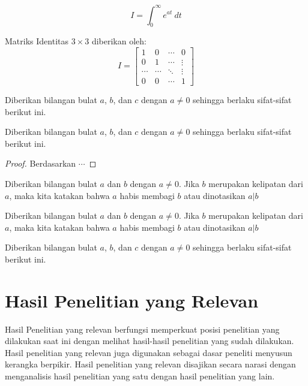 \begin{equation}
	I = \int_0^{\infty} e^{at}~{dt}
\end{equation}

Matriks Identitas $3 \times 3$ diberikan oleh:
\begin{equation}
	I = \begin{bmatrix}
		1 & 0 & \cdots & 0\\
		0 & 1 & \cdots & \vdots\\
		\cdots & \cdots & \ddots &\vdots\\
		0 & 0 & \cdots & 1
	\end{bmatrix}
\end{equation}

\begin{theorem}
	Diberikan bilangan bulat  $a$, $b$, dan $c$ dengan $a \neq 0$ sehingga berlaku sifat-sifat berikut ini.
\end{theorem}

\begin{theorem}
	Diberikan bilangan bulat  $a$, $b$, dan $c$ dengan $a \neq 0$ sehingga berlaku sifat-sifat berikut ini.
\end{theorem}

\begin{proof}
	Berdasarkan $\cdots$
\end{proof}

\begin{definition}
	Diberikan bilangan bulat $a$ dan $b$ dengan $a \neq 0$. Jika $b$ merupakan kelipatan dari $a$, maka kita katakan bahwa  $a$ habis membagi $b$ atau dinotasikan $a|b$
\end{definition}

\begin{example}
	Diberikan bilangan bulat $a$ dan $b$ dengan $a \neq 0$. Jika $b$ merupakan kelipatan dari $a$, maka kita katakan bahwa  $a$ habis membagi $b$ atau dinotasikan $a|b$
\end{example}

\begin{theorem}
	Diberikan bilangan bulat  $a$, $b$, dan $c$ dengan $a \neq 0$ sehingga berlaku sifat-sifat berikut ini.
\end{theorem}

\section{Hasil Penelitian yang Relevan}
Hasil Penelitian yang relevan berfungsi memperkuat posisi penelitian yang dilakukan saat ini dengan melihat hasil-hasil penelitian yang sudah dilakukan. Hasil penelitian yang relevan juga digunakan sebagai dasar peneliti menyusun kerangka berpikir. Hasil penelitian yang relevan disajikan secara narasi dengan menganalisis hasil penelitian yang satu dengan hasil penelitian yang lain.

